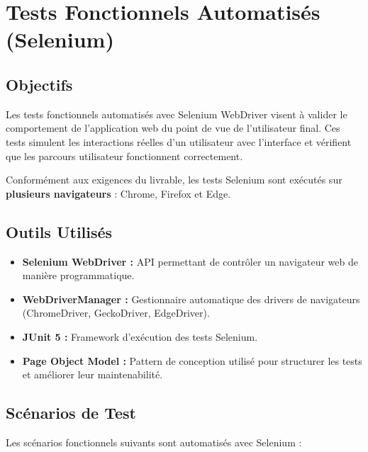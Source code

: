 \documentclass[12pt,a4paper]{report}
\begin{document}
\section{Tests Fonctionnels Automatisés (Selenium)}

\subsection{Objectifs}

Les tests fonctionnels automatisés avec Selenium WebDriver visent à valider le comportement de l'application web du point de vue de l'utilisateur final. Ces tests simulent les interactions réelles d'un utilisateur avec l'interface et vérifient que les parcours utilisateur fonctionnent correctement.

Conformément aux exigences du livrable, les tests Selenium sont exécutés sur \textbf{plusieurs navigateurs} : Chrome, Firefox et Edge.

\subsection{Outils Utilisés}

\begin{itemize}
    \item \textbf{Selenium WebDriver :} API permettant de contrôler un navigateur web de manière programmatique.
    
    \item \textbf{WebDriverManager :} Gestionnaire automatique des drivers de navigateurs (ChromeDriver, GeckoDriver, EdgeDriver).
    
    \item \textbf{JUnit 5 :} Framework d'exécution des tests Selenium.
    
    \item \textbf{Page Object Model :} Pattern de conception utilisé pour structurer les tests et améliorer leur maintenabilité.
\end{itemize}

\subsection{Scénarios de Test}

Les scénarios fonctionnels suivants sont automatisés avec Selenium :
\end{document}

